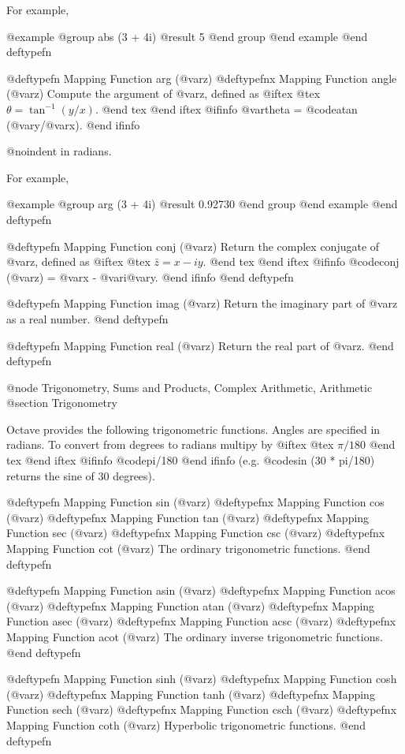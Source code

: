 For example,

@example
@group
abs (3 + 4i)
     @result{} 5
@end group
@end example
@end deftypefn

@deftypefn {Mapping Function} {} arg (@var{z})
@deftypefnx {Mapping Function} {} angle (@var{z})
Compute the argument of @var{z}, defined as
@iftex
@tex
$\theta = \tan^{-1}(y/x)$.
@end tex
@end iftex
@ifinfo
@var{theta} = @code{atan (@var{y}/@var{x})}.
@end ifinfo

@noindent
in radians. 

For example,

@example
@group
arg (3 + 4i)
     @result{} 0.92730
@end group
@end example
@end deftypefn

@deftypefn {Mapping Function} {} conj (@var{z})
Return the complex conjugate of @var{z}, defined as
@iftex
@tex
$\bar{z} = x - iy$.
@end tex
@end iftex
@ifinfo
@code{conj (@var{z})} = @var{x} - @var{i}@var{y}.
@end ifinfo
@end deftypefn

@deftypefn {Mapping Function} {} imag (@var{z})
Return the imaginary part of @var{z} as a real number.
@end deftypefn

@deftypefn {Mapping Function} {} real (@var{z})
Return the real part of @var{z}.
@end deftypefn

@node Trigonometry, Sums and Products, Complex Arithmetic, Arithmetic
@section Trigonometry

Octave provides the following trigonometric functions.  Angles are
specified in radians.  To convert from degrees to radians multipy by
@iftex
@tex
$\pi/180$
@end tex
@end iftex
@ifinfo
@code{pi/180}
@end ifinfo
 (e.g. @code{sin (30 * pi/180)} returns the sine of 30 degrees).

@deftypefn {Mapping Function} {} sin (@var{z})
@deftypefnx {Mapping Function} {} cos (@var{z})
@deftypefnx {Mapping Function} {} tan (@var{z})
@deftypefnx {Mapping Function} {} sec (@var{z})
@deftypefnx {Mapping Function} {} csc (@var{z})
@deftypefnx {Mapping Function} {} cot (@var{z})
The ordinary trigonometric functions.
@end deftypefn

@deftypefn {Mapping Function} {} asin (@var{z})
@deftypefnx {Mapping Function} {} acos (@var{z})
@deftypefnx {Mapping Function} {} atan (@var{z})
@deftypefnx {Mapping Function} {} asec (@var{z})
@deftypefnx {Mapping Function} {} acsc (@var{z})
@deftypefnx {Mapping Function} {} acot (@var{z})
The ordinary inverse trigonometric functions.
@end deftypefn

@deftypefn {Mapping Function} {} sinh (@var{z})
@deftypefnx {Mapping Function} {} cosh (@var{z})
@deftypefnx {Mapping Function} {} tanh (@var{z})
@deftypefnx {Mapping Function} {} sech (@var{z})
@deftypefnx {Mapping Function} {} csch (@var{z})
@deftypefnx {Mapping Function} {} coth (@var{z})
Hyperbolic trigonometric functions.
@end deftypefn

